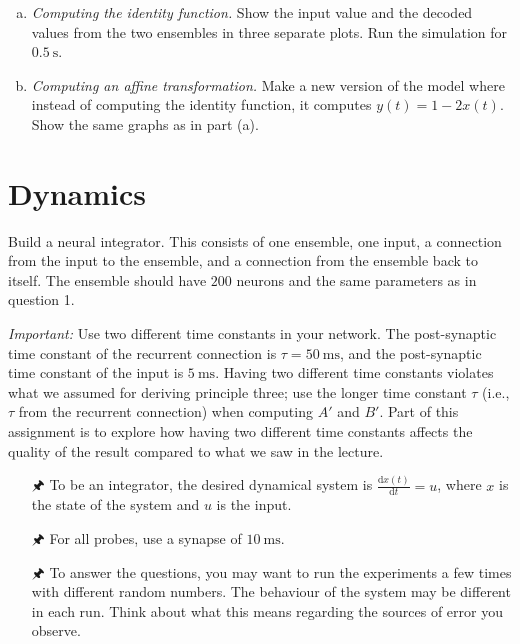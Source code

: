 	\begin{enumerate}[a)]
		\item {} \emph{Computing the identity function.} Show the input value and the decoded values from the two  ensembles in three separate plots. Run the simulation for $\SI{0.5}{\second}$.
		\item {} \emph{Computing an affine transformation.} Make a new version of the model where instead of computing the identity function, it computes $y(t) = 1 - 2x(t)$. Show the same graphs as in part (a).
	\end{enumerate}


	\section{Dynamics}
	
	Build a neural integrator. This consists of one ensemble, one input, a connection from the input to the ensemble, and a connection from the ensemble back to itself. The ensemble should have $200$ neurons and the same parameters as in question 1.
	
	\emph{Important:} Use two different time constants in your network. The post-synaptic time constant of the recurrent connection is $\tau = \SI{50}{\milli\second}$, and the post-synaptic time constant of the input is $\SI{5}{\milli\second}$. Having two different time constants violates what we assumed for deriving principle three; use the longer time constant $\tau$ (i.e., $\tau$ from the recurrent connection) when computing $A'$ and $B'$. Part of this assignment is to explore how having two different time constants affects the quality of the result compared to what we saw in the lecture.

	\begin{itemize}	
		\item[{\symbolfont 🖈}] To be an integrator, the desired dynamical system is $\frac{\mathrm{d}x(t)}{\mathrm{d}t} = u$, where $x$ is the state of the system and $u$ is the input.
		\item[{\symbolfont 🖈}] For all probes, use a synapse of $\SI{10}{\milli\second}$.
		\item[{\symbolfont 🖈}] To answer the questions, you may want to run the experiments a few times with different random numbers. The behaviour of the system may be different in each run. Think about what this means regarding the sources of error you observe.
	\end{itemize}

